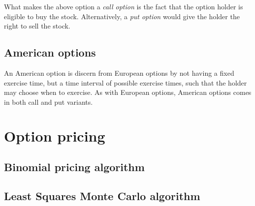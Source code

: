 What makes the above option a \textit{call option} is the fact that
the option holder is eligible to buy the stock. Alternatively, a
\textit{put option} would give the holder the right to sell the stock.

\subsection{American options}
An American option is discern from European options by not having a
fixed exercise time, but a time interval of possible exercise times,
such that the holder may choose when to exercise. As with European
options, American options comes in both call and put variants.



\section{Option pricing}


\subsection{Binomial pricing algorithm}


\subsection{Least Squares Monte Carlo algorithm}


